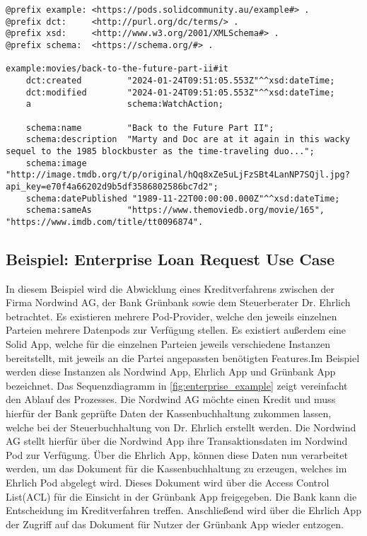 \documentclass[acmtog]{acmart}
\begin{document}
\begin{minipage}{\linewidth}
\begin{lstlisting}[captionpos=b, caption=Ressource des Films Zurück in die Zukunft II welche im Beispielpod unter https://pods.solidcommunity.au/example/movies/back-to-the-future-part-ii abgelegt wurde. Zur besseren übersicht wurden Prefixe eingeführt., label=lst:ressourcebttf2,frame=single]
@prefix example: <https://pods.solidcommunity.au/example#> .
@prefix dct:     <http://purl.org/dc/terms/> .
@prefix xsd:     <http://www.w3.org/2001/XMLSchema#> .
@prefix schema:  <https://schema.org/#> .

example:movies/back-to-the-future-part-ii#it
    dct:created         "2024-01-24T09:51:05.553Z"^^xsd:dateTime;
    dct:modified        "2024-01-24T09:51:05.553Z"^^xsd:dateTime;
    a                   schema:WatchAction;
    
    schema:name         "Back to the Future Part II";
    schema:description  "Marty and Doc are at it again in this wacky sequel to the 1985 blockbuster as the time-traveling duo...";
    schema:image        "http://image.tmdb.org/t/p/original/hQq8xZe5uLjFzSBt4LanNP7SQjl.jpg?api_key=e70f4a66202d9b5df3586802586bc7d2";
    schema:datePublished "1989-11-22T00:00:00.000Z"^^xsd:dateTime;
    schema:sameAs       "https://www.themoviedb.org/movie/165", "https://www.imdb.com/title/tt0096874".
\end{lstlisting}
\end{minipage}
\subsection{Beispiel: Enterprise Loan Request Use Case}
In diesem Beispiel wird die Abwicklung eines Kreditverfahrens zwischen der Firma Nordwind AG, der Bank Grünbank sowie dem Steuerberater Dr. Ehrlich betrachtet. Es existieren mehrere Pod-Provider, welche den jeweils einzelnen Parteien mehrere Datenpods zur Verfügung stellen. Es existiert außerdem eine Solid App, welche für die einzelnen Parteien jeweils verschiedene Instanzen bereitstellt, mit jeweils an die Partei angepassten benötigten Features.Im Beispiel werden diese Instanzen als Nordwind App, Ehrlich App und Grünbank App bezeichnet. Das Sequenzdiagramm in \ref{fig:enterprise_example} zeigt vereinfacht den Ablauf des Prozesses. Die Nordwind AG möchte einen Kredit und muss hierfür der Bank geprüfte Daten der Kassenbuchhaltung zukommen lassen, welche bei der Steuerbuchhaltung von Dr. Ehrlich erstellt werden. Die Nordwind AG stellt hierfür über die Nordwind App ihre Transaktionsdaten im Nordwind Pod zur Verfügung. Über die Ehrlich App, können diese Daten nun verarbeitet werden, um das Dokument für die Kassenbuchhaltung zu erzeugen, welches im Ehrlich Pod abgelegt wird. Dieses Dokument wird über die Access Control List(ACL) für die Einsicht in der Grünbank App freigegeben. Die Bank kann die Entscheidung im Kreditverfahren treffen. Anschließend wird über die Ehrlich App der Zugriff auf das Dokument für Nutzer der Grünbank App wieder entzogen.
\end{document}
